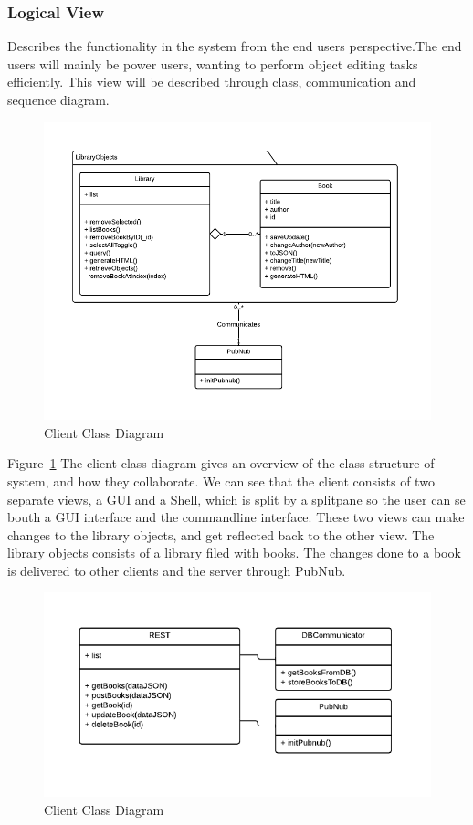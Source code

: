 \subsubsection{Logical View}
Describes the functionality in the system from the end users perspective.The end users will mainly be power users, wanting to perform object editing tasks efficiently. This view will be described through class, communication and sequence diagram.

\begin{figure}[h]
\centering
\includegraphics[width=6in]{image/s1clientClassDiagram.png}
\caption{Client Class Diagram}
\label{figure:s1clientClassDiagram}
\end{figure}

Figure~\ref{figure:s1clientClassDiagram} The client class diagram gives an overview of the class structure of system, and how they collaborate. We can see that the client consists of two separate views, a GUI and a Shell, which is split by a splitpane so the user can se bouth a GUI interface and the commandline interface. These two views can make changes to the library objects, and get reflected back to the other view. The library objects consists of a library filed with books. The changes done to a book is delivered to other clients and the server through PubNub. 

\begin{figure}[h]
\centering
\includegraphics[width=5in]{image/s1serverClassDiagram.png}
\caption{Client Class Diagram}
\label{figure:s1serverClassDiagram}
\end{figure}

